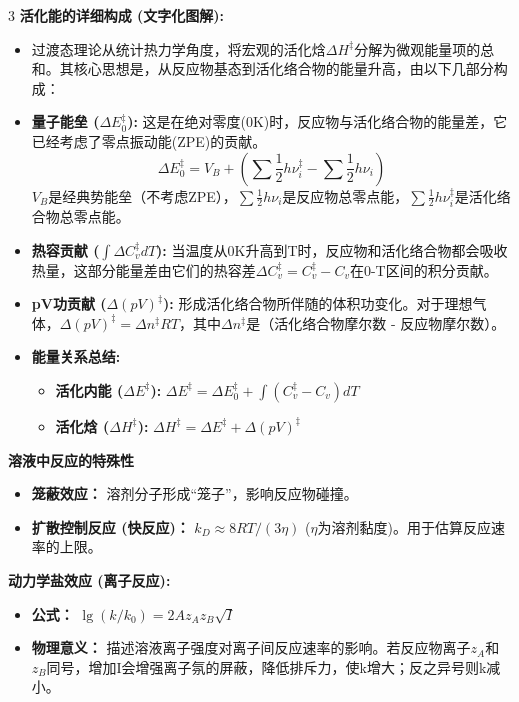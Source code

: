 \documentclass[a4paper,6pt]{article} %
\begin{document}
\begin{multicols}{3}
\textbf{活化能的详细构成 (文字化图解):}
\begin{itemize}
    \item 过渡态理论从统计热力学角度，将宏观的活化焓$\Delta H^\ddagger$分解为微观能量项的总和。其核心思想是，从反应物基态到活化络合物的能量升高，由以下几部分构成：
    \item \textbf{量子能垒 ($\Delta E_0^\ddagger$):} 这是在绝对零度(0K)时，反应物与活化络合物的能量差，它已经考虑了零点振动能(ZPE)的贡献。
    \[ \Delta E_0^\ddagger = V_B + \left( \sum \frac{1}{2}h\nu_i^\ddagger - \sum \frac{1}{2}h\nu_i \right) \]
    $V_B$是经典势能垒（不考虑ZPE），$\sum \frac{1}{2}h\nu_i$是反应物总零点能，$\sum \frac{1}{2}h\nu_i^\ddagger$是活化络合物总零点能。
    \item \textbf{热容贡献 ($\int \Delta C_v^\ddagger dT$):} 当温度从0K升高到T时，反应物和活化络合物都会吸收热量，这部分能量差由它们的热容差$\Delta C_v^\ddagger = C_v^\ddagger - C_v$在0-T区间的积分贡献。
    \item \textbf{pV功贡献 ($\Delta(pV)^\ddagger$):} 形成活化络合物所伴随的体积功变化。对于理想气体，$\Delta(pV)^\ddagger = \Delta n^\ddagger RT$，其中$\Delta n^\ddagger$是（活化络合物摩尔数 - 反应物摩尔数）。
    \item \textbf{能量关系总结:}
    \begin{itemize}
        \item \textbf{活化内能 ($\Delta E^\ddagger$):} $\Delta E^\ddagger = \Delta E_0^\ddagger + \int(C_v^\ddagger - C_v)dT$
        \item \textbf{活化焓 ($\Delta H^\ddagger$):} $\Delta H^\ddagger = \Delta E^\ddagger + \Delta(pV)^\ddagger$
    \end{itemize}
\end{itemize}

\textbf{溶液中反应的特殊性}
\begin{itemize}
    \item \textbf{笼蔽效应：} 溶剂分子形成“笼子”，影响反应物碰撞。
    \item \textbf{扩散控制反应 (快反应)：} $k_D \approx 8RT / (3\eta)$ ($\eta$为溶剂黏度)。用于估算反应速率的上限。
\end{itemize}

\textbf{动力学盐效应 (离子反应):}
\begin{itemize}
    \item \textbf{公式：} $\lg(k/k_0) = 2A z_A z_B \sqrt{I}$
    \item \textbf{物理意义：} 描述溶液离子强度对离子间反应速率的影响。若反应物离子$z_A$和$z_B$同号，增加I会增强离子氛的屏蔽，降低排斥力，使k增大；反之异号则k减小。
\end{itemize}


\end{multicols}
\end{document}
